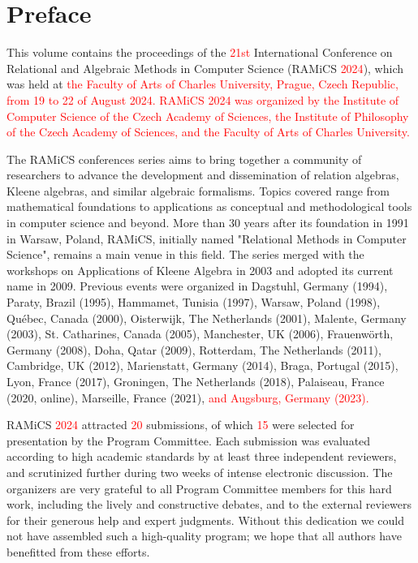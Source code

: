 \documentclass{llncs}
\newcommand{\red}[1]{\textcolor{red}{#1}}
\begin{document}
\section*{Preface}
This volume contains the proceedings of the \red{21st} International
Conference on Relational and Algebraic Methods in Computer Science
(RAMiCS \red{2024}), which was held at \red{the Faculty of Arts of Charles University, 
Prague, Czech Republic, from 19 to 22 of August 2024. RAMiCS 2024 was organized by the Institute of Computer Science of the Czech Academy of Sciences, the Institute of Philosophy of the Czech Academy of Sciences, and the Faculty of Arts of Charles University.}

The RAMiCS conferences series aims to bring together a community of
researchers to advance the development and dissemination of relation
algebras, Kleene algebras, and similar algebraic formalisms. Topics
covered range from mathematical foundations to applications as
conceptual and methodological tools in computer science and
beyond. More than 30 years after its foundation in 1991 in Warsaw,
Poland, RAMiCS, initially named "Relational Methods in Computer
Science", remains a main venue in this field. The series merged with
the workshops on Applications of Kleene Algebra in 2003 and adopted
its current name in 2009. Previous events were organized in Dagstuhl,
Germany (1994), Paraty, Brazil (1995), Hammamet, Tunisia (1997),
Warsaw, Poland (1998), Qu\'ebec, Canada (2000), Oisterwijk, The
Netherlands (2001), Malente, Germany (2003), St. Catharines, Canada
(2005), Manchester, UK (2006), Frauenw\"orth, Germany (2008), Doha,
Qatar (2009), Rotterdam, The Netherlands (2011), Cambridge, UK (2012),
Marienstatt, Germany (2014), Braga, Portugal (2015), Lyon, France
(2017), Groningen, The Netherlands (2018), Palaiseau, France (2020,
online), Marseille, France (2021), \red{and Augsburg, Germany (2023).}

RAMiCS \red{2024} attracted \red{20} submissions, of which \red{15} were
selected for presentation by the Program Committee. Each submission
was evaluated according to high academic standards by at least three
independent reviewers, and scrutinized further during two weeks of
intense electronic discussion. The organizers are very grateful to all
Program Committee members for this hard work, including the lively and
constructive debates, and to the external reviewers for their generous
help and expert judgments. Without this dedication we could not have
assembled such a high-quality program; we hope that all authors have
benefitted from these efforts.
\end{document}
